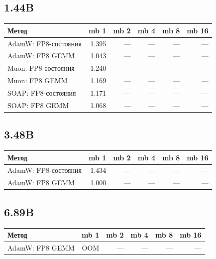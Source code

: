 \documentclass[10pt]{article}
\begin{document}
\subsection{1.44B}
\begin{center}
\small
\begin{tabular}{lrrrrr}
\toprule
\textbf{Метод} & \textbf{mb 1} & \textbf{mb 2} & \textbf{mb 4} & \textbf{mb 8} & \textbf{mb 16} \\
\midrule
AdamW: FP8-состояния & 1.395 & --- & --- & --- & --- \\
AdamW: FP8 GEMM & 1.043 & --- & --- & --- & --- \\
Muon: FP8-состояния & 1.240 & --- & --- & --- & --- \\
Muon: FP8 GEMM & 1.169 & --- & --- & --- & --- \\
SOAP: FP8-состояния & 1.171 & --- & --- & --- & --- \\
SOAP: FP8 GEMM & 1.068 & --- & --- & --- & --- \\
\bottomrule
\end{tabular}
\end{center}
\subsection{3.48B}
\begin{center}
\small
\begin{tabular}{lrrrrr}
\toprule
\textbf{Метод} & \textbf{mb 1} & \textbf{mb 2} & \textbf{mb 4} & \textbf{mb 8} & \textbf{mb 16} \\
\midrule
AdamW: FP8-состояния & 1.434 & --- & --- & --- & --- \\
AdamW: FP8 GEMM & 1.000 & --- & --- & --- & --- \\
\bottomrule
\end{tabular}
\end{center}
\subsection{6.89B}
\begin{center}
\small
\begin{tabular}{lrrrrr}
\toprule
\textbf{Метод} & \textbf{mb 1} & \textbf{mb 2} & \textbf{mb 4} & \textbf{mb 8} & \textbf{mb 16} \\
\midrule
AdamW: FP8 GEMM & \textcolor{oomgray}{OOM} & --- & --- & --- & --- \\
\bottomrule
\end{tabular}
\end{center}
\end{document}
